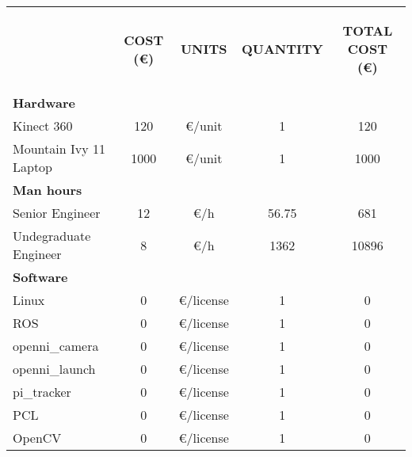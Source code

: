 \begin{appendices}

\begin{table}[H]
\centering
\begin{tabular} {l c c c c}
\toprule
\addlinespace[3mm]
   \multicolumn{1}{c}{\begin{center}\textbf{ITEM}\end{center}} &
   \multicolumn{1}{c}{\begin{center}\textbf{COST (\euro)}\end{center}} &
   \multicolumn{1}{c}{\begin{center}\textbf{UNITS}\end{center}} &
   \multicolumn{1}{c}{\begin{center}\textbf{QUANTITY}\end{center}} &
   \multicolumn{1}{c}{\begin{center}\textbf{TOTAL COST (\euro)}\end{center}} &
\\
\addlinespace[-3mm]
\midrule
\textbf{Hardware}	&&&&		\\					
\hspace*{0.5cm}	Kinect 360	&	120	&	\euro/unit	&	1 	&	120 \\
\hspace*{0.5cm}	Mountain Ivy 11 Laptop	&	1000	&	\euro/unit	&	1	&	1000\\		
\textbf{Man hours}													&&&&		\\		
\hspace*{0.5cm}	Senior Engineer 	&	12	&\euro/h	&	56.75	&	681\\
\hspace*{0.5cm}	Undegraduate Engineer	&	8	&	\euro/h		&	1362	&	10896 \\
						
\textbf{Software}			&&&&		\\						
						
\hspace*{0.5cm}	Linux	&	0 &	\euro/license	&	1	&	0\\
\hspace*{0.5cm}	ROS	&	0	&\euro/license&	1	&0\\
\hspace*{0.8cm}		openni\_camera	&	0	&	\euro/license	&1&		0\\
\hspace*{0.8cm}		openni\_launch	&	0	&	\euro/license	&1&	0\\
\hspace*{0.8cm}		pi\_tracker 		&	0	&	\euro/license	&1&	0\\
\hspace*{0.5cm}	PCL		&	0	&	\euro/license	&	1	&	0\\
\hspace*{0.5cm}	OpenCV	&	0	&	\euro/license	&	1	&	0\\
						

\end{tabular}
\end{table}
\end{appendices}
